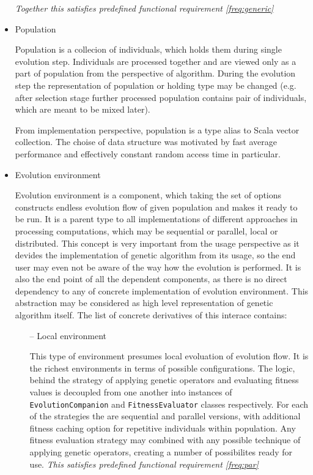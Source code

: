 \begin{itemize}
\smallskip \textit{Together this satisfies predefined functional requirement \ref{freq:generic}}

\medbreak

\item
Population

Population is a collecion of individuals, which holds them during single evolution step. Individuals are processed together and are viewed only as a part of population from the perspective of algorithm. During the evolution step the representation of population or holding type may be changed (e.g. after selection stage further processed population contains pair of individuals, which are meant to be mixed later).

From implementation perspective, population is a type alias to Scala vector collection. The choise of data structure was motivated by fast average performance and effectively constant random access time in particular.
\medbreak

\item
Evolution environment

Evolution environment is a component, which taking the set of options constructs endless evolution flow of given population and makes it ready to be run. It is a parent type to all implementations of different approaches in processing computations, which may be sequential or parallel, local or distributed. This concept is very important from the usage perspective as it devides the implementation of genetic algorithm from its usage, so the end user may even not be aware of the way how the evolution is performed. It is also the end point of all the dependent components, as there is no direct dependency to any of concrete implementation of evolution environment. This abstraction may be considered as high level representation of genetic algorithm itself. The list of concrete derivatives of this interace contains:
\begin{itemize}
\item[--]
Local environment

This type of environment presumes local evoluation of evolution flow. It is the richest environments in terms of possible configurations. The logic, behind the strategy of applying genetic operators and evaluating fitness values is decoupled from one another into instances of \texttt{EvolutionCompanion} and \texttt{FitnessEvaluator} classes respectively. For each of the strategies the are sequential and parallel versions, with additional fitness caching option for repetitive individuals within population. Any fitness evaluation strategy may combined with any possible technique of applying genetic operators, creating a number of possibilites ready for use.
\smallskip\textit{This satisfies predefined functional requirement \ref{freq:par}}
\medbreak


\end{itemize}
\end{itemize}
